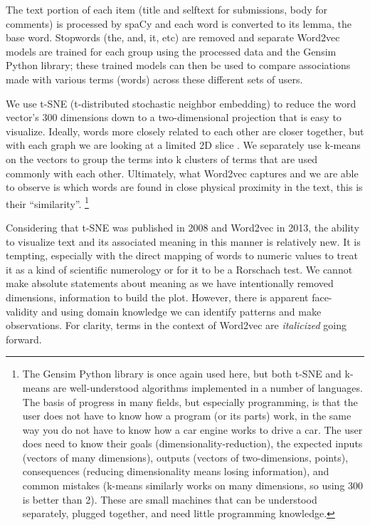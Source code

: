 The text portion of each item (title and selftext for submissions, body for comments) is processed by spaCy and each word is converted to its lemma, the base word.
Stopwords (the, and, it, etc) are removed and separate Word2vec models are trained for each group using the processed data and the Gensim Python library; these trained models can then be used to compare associations made with various terms (words) across these different sets of users.

We use t-SNE (t-distributed stochastic neighbor embedding) to reduce the word vector's 300 dimensions down to a two-dimensional projection that is easy to visualize.
Ideally, words more closely related to each other are closer together, but with each graph we are looking at a limited 2D slice \cite{van2008}.
We separately use k-means on the vectors to group the terms into k clusters of terms that are used commonly with each other. 
Ultimately, what Word2vec captures and we are able to observe is which words are found in close physical proximity in the text, this is their ``similarity''. \footnote{The Gensim Python library is once again used here, but both t-SNE and k-means are well-understood algorithms implemented in a number of languages.
The basis of progress in many fields, but especially programming, is that the user does not have to know how a program (or its parts) work, in the same way you do not have to know how a car engine works to drive a car.
The user does need to know their goals (dimensionality-reduction), the expected inputs (vectors of many dimensions), outputs (vectors of two-dimensions, points), consequences (reducing dimensionality means losing information), and common mistakes (k-means similarly works on many dimensions, so using 300 is better than 2).
These are small machines that can be understood separately, plugged together, and need little programming knowledge.}

Considering that t-SNE was published in 2008 and Word2vec in 2013, the ability to visualize text and its associated meaning in this manner is relatively new. 
It is tempting, especially with the direct mapping of words to numeric values to treat it as a kind of scientific numerology or for it to be a Rorschach test. We cannot make absolute statements about meaning as we have intentionally removed dimensions, information to build the plot.
However, there is apparent face-validity and using domain knowledge we can identify patterns and make observations.
For clarity, terms in the context of Word2vec are \emph{italicized} going forward.

